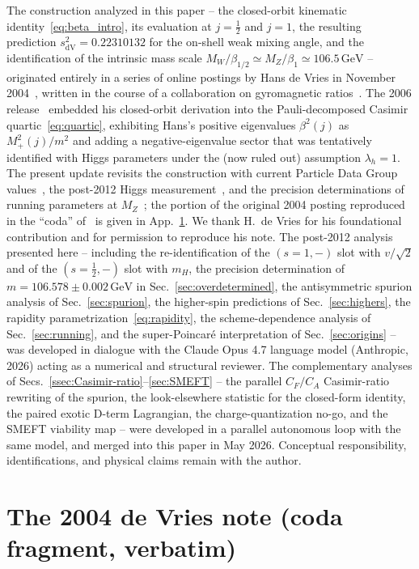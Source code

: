 \documentclass[twocolumn,aps,prd,floatfix,nofootinbib,superscriptaddress,10pt]{article}
\newcommand{\MW}{M_W}
\newcommand{\MZ}{M_Z}
\newcommand{\sdV}{s^2_{\mathrm{dV}}}
\newcommand{\GeV}{\,\mathrm{GeV}}
\newcommand{\CF}{C_F}
\newcommand{\CA}{C_A}
\begin{document}
The construction analyzed in this paper -- the closed-orbit kinematic identity~\eqref{eq:beta_intro}, its evaluation at $j=\tfrac12$ and $j=1$, the resulting prediction $\sdV=0.22310132$ for the on-shell weak mixing angle, and the identification of the intrinsic mass scale $\MW/\beta_{1/2}\simeq\MZ/\beta_1\simeq 106.5\GeV$ -- originated entirely in a series of online postings by Hans de Vries in November 2004~\cite{deVries2004}, written in the course of a collaboration on gyromagnetic ratios~\cite{deVriesRivero2005}. The 2006 release~\cite{Rivero2006} embedded his closed-orbit derivation into the Pauli-decomposed Casimir quartic~\eqref{eq:quartic}, exhibiting Hans's positive eigenvalues $\beta^2(j)$ as $M^2_+(j)/m^2$ and adding a negative-eigenvalue sector that was tentatively identified with Higgs parameters under the (now ruled out) assumption $\lambda_h=1$. The present update revisits the construction with current Particle Data Group values~\cite{PDG2024}, the post-2012 Higgs measurement~\cite{ATLAS2012,CMS2012}, and the precision determinations of running parameters at $\MZ$~\cite{AntuschHinzeSaad2026}; the portion of the original 2004 posting reproduced in the ``coda'' of~\cite{Rivero2006} is given in App.~\ref{app:deVries}. We thank H.~de Vries for his foundational contribution and for permission to reproduce his note. The post-2012 analysis presented here -- including the re-identification of the $(s=1,-)$ slot with $v/\sqrt{2}$ and of the $(s=\tfrac12,-)$ slot with $m_H$, the precision determination of $m=106.578\pm 0.002\GeV$ in Sec.~\ref{sec:overdetermined}, the antisymmetric spurion analysis of Sec.~\ref{sec:spurion}, the higher-spin predictions of Sec.~\ref{sec:highers}, the rapidity parametrization~\eqref{eq:rapidity}, the scheme-dependence analysis of Sec.~\ref{sec:running}, and the super-Poincar\'e interpretation of Sec.~\ref{sec:origins} -- was developed in dialogue with the Claude Opus 4.7 language model (Anthropic, 2026) acting as a numerical and structural reviewer.  The complementary analyses of Secs.~\ref{ssec:Casimir-ratio}--\ref{sec:SMEFT} -- the parallel $\CF/\CA$ Casimir-ratio rewriting of the spurion, the look-elsewhere statistic for the closed-form identity, the paired exotic D-term Lagrangian, the charge-quantization no-go, and the SMEFT viability map -- were developed in a parallel autonomous loop with the same model, and merged into this paper in May 2026.  Conceptual responsibility, identifications, and physical claims remain with the author.

\appendix
\section{The 2004 de Vries note (coda fragment, verbatim)}
\label{app:deVries}
\end{document}
